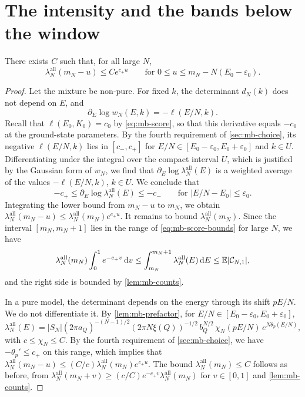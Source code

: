 \section{The intensity and the bands below the window}\label{sec:mb-lowsum}

\begin{lemma}\label{lem:mb-envelope}
There exists $C$ such that, for all large $N$,
\begin{equation}\label{eq:mb-envelope}
\lambda^{\mathrm{all}}_N(m_N-u)\le Ce^{c_+u}\qquad\text{for }0\le u\le m_N-N(E_0-\varepsilon_0).
\end{equation}
\end{lemma}

\begin{proof}
Let the mixture be non-pure. For fixed $k$, the determinant $d_N(k)$ does not depend on $E$, and
\[
\partial_E\log w_N(E,k)=-\ell(E/N,k) .
\]
Recall that $\ell(E_0,K_0)=c_0$ by \eqref{eq:mb-score}, so that this derivative equals $-c_0$ at the ground-state parameters. By the fourth requirement of \cref{sec:mb-choice}, its negative $\ell(E/N,k)$ lies in $[c_-,c_+]$ for $E/N\in[E_0-\varepsilon_0,E_0+\varepsilon_0]$ and $k\in U$. Differentiating under the integral over the compact interval $U$, which is justified by the Gaussian form of $w_N$, we find that $\partial_E\log\lambda^{\mathrm{all}}_N(E)$ is a weighted average of the values $-\ell(E/N,k)$, $k\in U$. We conclude that
\begin{equation}\label{eq:mb-score-bounds}
-c_+\le\partial_E\log\lambda^{\mathrm{all}}_N(E)\le-c_-\qquad\text{for }|E/N-E_0|\le\varepsilon_0 .
\end{equation}
Integrating the lower bound from $m_N-u$ to $m_N$, we obtain $\lambda^{\mathrm{all}}_N(m_N-u)\le\lambda^{\mathrm{all}}_N(m_N)e^{c_+u}$. It remains to bound $\lambda^{\mathrm{all}}_N(m_N)$. Since the interval $[m_N,m_N+1]$ lies in the range of \eqref{eq:mb-score-bounds} for large $N$, we have
\[
\lambda^{\mathrm{all}}_N(m_N)\int_0^1e^{-c_+v}\,\mathrm d v\le\int_{m_N}^{m_N+1}\lambda^{\mathrm{all}}_N(E)\,\mathrm d E\le\mathbb E|\mathcal C_{N,1}|,
\]
and the right side is bounded by \cref{lem:mb-counts}.

In a pure model, the determinant depends on the energy through its shift $pE/N$. We do not differentiate it. By \cref{lem:mb-prefactor}, for $E/N\in[E_0-\varepsilon_0,E_0+\varepsilon_0]$,
\[
\lambda^{\mathrm{all}}_N(E)=|S_N|(2\pi a_Q)^{-(N-1)/2}(2\pi N\xi(Q))^{-1/2}\,b_Q^{N/2}\,\chi_N(pE/N)\,e^{N\theta_p(E/N)},
\]
with $c\le\chi_N\le C$. By the fourth requirement of \cref{sec:mb-choice}, we have $-\theta_p'\le c_+$ on this range, which implies that $\lambda^{\mathrm{all}}_N(m_N-u)\le(C/c)\lambda^{\mathrm{all}}_N(m_N)e^{c_+u}$. The bound $\lambda^{\mathrm{all}}_N(m_N)\le C$ follows as before, from $\lambda^{\mathrm{all}}_N(m_N+v)\ge(c/C)e^{-c_+v}\lambda^{\mathrm{all}}_N(m_N)$ for $v\in[0,1]$ and \cref{lem:mb-counts}.
\end{proof}

